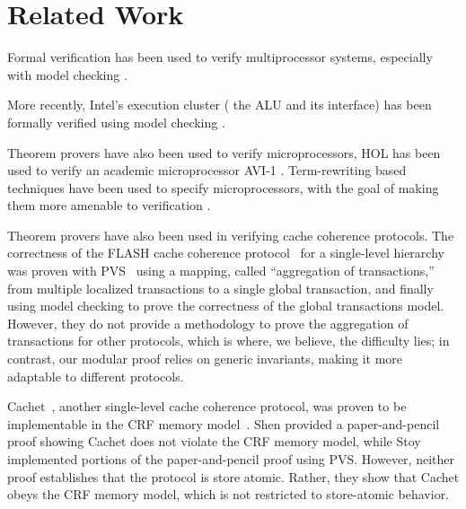 \section{Related Work}
\label{relatedWork}

Formal verification has been used to verify multiprocessor
systems, especially with model checking
\cite{burch1994automatic,mcmillan1998verification}.

More recently, Intel's execution cluster (\ie{} the ALU and its
interface) has been formally verified using model checking
\cite{kaivola2009replacing}.

Theorem provers have also been used to verify microprocessors, \eg{} HOL has been
used to verify an academic microprocessor AVI-1 \cite{windley1995formal}.
Term-rewriting based techniques have been used to specify microprocessors, with
the goal of making them more amenable to verification \cite{shen1999using}.



Theorem provers have also been used in verifying cache coherence protocols.
The correctness of the FLASH cache coherence protocol~\cite{flash} for a
single-level hierarchy was proven with PVS~\cite{park} using a mapping, called
``aggregation of transactions,'' from multiple localized transactions to a
single global transaction, and finally using model checking to prove the correctness of
the global transactions model. However, they do not provide a methodology to
prove the aggregation of transactions for other protocols, which is where, we
believe, the difficulty lies; in contrast, our modular proof relies on generic
invariants, making it more adaptable to different protocols.

Cachet~\cite{StoyShenArvind:Proofs}, another single-level cache coherence
protocol, was proven to be implementable in the CRF memory
model~\cite{Shen:CRF}. Shen \etal{} provided a paper-and-pencil proof showing
Cachet does not violate the CRF memory model, while Stoy \etal{} implemented
portions of the paper-and-pencil proof using PVS. However, neither proof
establishes that the protocol is store atomic. Rather, they show that Cachet
obeys the CRF memory model, which is not restricted to store-atomic behavior.

